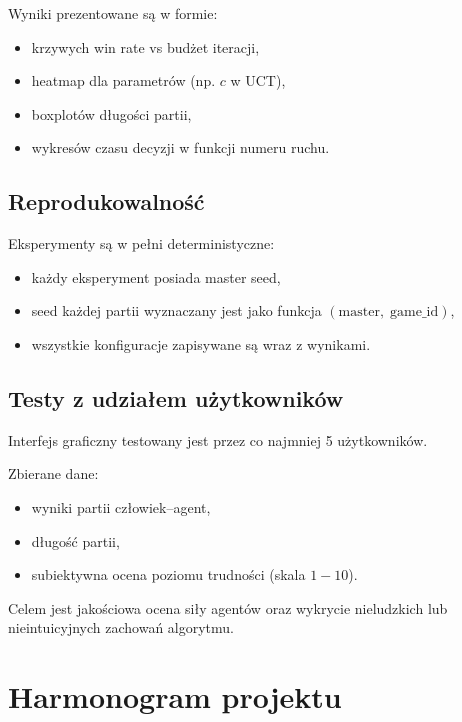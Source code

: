 \documentclass[12pt,a4paper]{article}
\begin{document}
Wyniki prezentowane są w formie:

\begin{itemize}[leftmargin=2em]
  \item krzywych win rate vs budżet iteracji,
  \item heatmap dla parametrów (np. $c$ w UCT),
  \item boxplotów długości partii,
  \item wykresów czasu decyzji w funkcji numeru ruchu.
\end{itemize}

\subsection{Reprodukowalność}

Eksperymenty są w pełni deterministyczne:
\begin{itemize}[leftmargin=2em]
  \item każdy eksperyment posiada master seed,
  \item seed każdej partii wyznaczany jest jako funkcja $(\text{master},\; \text{game\_id})$,
  \item wszystkie konfiguracje zapisywane są wraz z wynikami.
\end{itemize}

\subsection{Testy z udziałem użytkowników}

Interfejs graficzny testowany jest przez co najmniej 5 użytkowników.

Zbierane dane:
\begin{itemize}[leftmargin=2em]
  \item wyniki partii człowiek--agent,
  \item długość partii,
  \item subiektywna ocena poziomu trudności (skala $1-10$).
\end{itemize}

Celem jest jakościowa ocena siły agentów oraz wykrycie nieludzkich lub nieintuicyjnych zachowań algorytmu.



\section{Harmonogram projektu}
\end{document}

